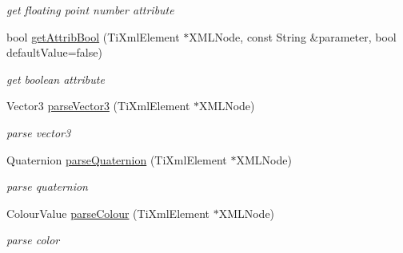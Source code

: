 \begin{DoxyCompactItemize}
\begin{DoxyCompactList}\small\item\em get floating point number attribute \end{DoxyCompactList}\item 
bool \hyperlink{class_ogre_1_1_dot_scene_loader_af5b882f77a1abebf7e1d59959de7c252}{get\+Attrib\+Bool} (Ti\+Xml\+Element $\ast$X\+M\+L\+Node, const String \&parameter, bool default\+Value=false)\hypertarget{class_ogre_1_1_dot_scene_loader_af5b882f77a1abebf7e1d59959de7c252}{}\label{class_ogre_1_1_dot_scene_loader_af5b882f77a1abebf7e1d59959de7c252}

\begin{DoxyCompactList}\small\item\em get boolean attribute \end{DoxyCompactList}\item 
Vector3 \hyperlink{class_ogre_1_1_dot_scene_loader_ad764d5660b72a936940d5d6cecadfe11}{parse\+Vector3} (Ti\+Xml\+Element $\ast$X\+M\+L\+Node)\hypertarget{class_ogre_1_1_dot_scene_loader_ad764d5660b72a936940d5d6cecadfe11}{}\label{class_ogre_1_1_dot_scene_loader_ad764d5660b72a936940d5d6cecadfe11}

\begin{DoxyCompactList}\small\item\em parse vector3 \end{DoxyCompactList}\item 
Quaternion \hyperlink{class_ogre_1_1_dot_scene_loader_aefaa396728cce85e9bd16cbeda458b52}{parse\+Quaternion} (Ti\+Xml\+Element $\ast$X\+M\+L\+Node)
\begin{DoxyCompactList}\small\item\em parse quaternion \end{DoxyCompactList}\item 
Colour\+Value \hyperlink{class_ogre_1_1_dot_scene_loader_a103d61d156e8271bc567b54a6d9415c9}{parse\+Colour} (Ti\+Xml\+Element $\ast$X\+M\+L\+Node)\hypertarget{class_ogre_1_1_dot_scene_loader_a103d61d156e8271bc567b54a6d9415c9}{}\label{class_ogre_1_1_dot_scene_loader_a103d61d156e8271bc567b54a6d9415c9}

\begin{DoxyCompactList}\small\item\em parse color \end{DoxyCompactList}\end{DoxyCompactItemize}
